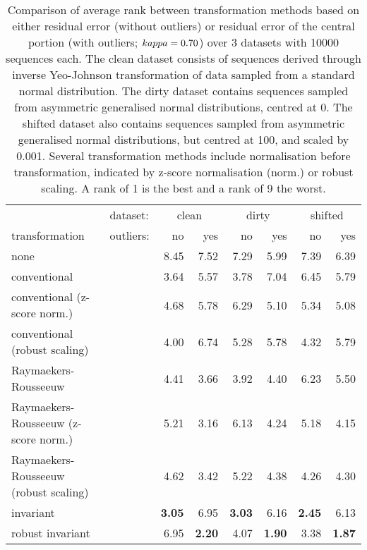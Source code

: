 \documentclass[
  a4paper,
]{article}
\begin{document}
\begin{table}
\begin{center}
\caption{
Comparison of average rank between transformation methods based on either residual error (without outliers) or residual error of the central portion
(with outliers; $\\kappa = 0.70$) over 3 datasets with 10000 sequences each. The clean dataset consists of sequences derived through inverse Yeo-Johnson transformation
of data sampled from a standard normal distribution. The dirty dataset contains sequences sampled from asymmetric generalised normal distributions, centred at 0.
The shifted dataset also contains sequences sampled from asymmetric generalised normal distributions, but centred at 100, and scaled by 0.001.
Several transformation methods include normalisation before transformation, indicated by z-score normalisation (norm.) or robust scaling.
A rank of 1 is the best and a rank of 9 the worst.
}
\label{tab:comparison_methods_simulations}
\begin{tabular}{l | l r r r r r r}

\toprule
& dataset: & \multicolumn{2}{c}{clean} & \multicolumn{2}{c}{dirty} & \multicolumn{2}{c}{shifted} \\
transformation & outliers: & no & yes & no & yes & no & yes \\

\midrule

none                                  & &         8.45  &         7.52  &         7.29  &         5.99  &         7.39  &         6.39 \\
conventional                          & &         3.64  &         5.57  &         3.78  &         7.04  &         6.45  &         5.79 \\
conventional (z-score norm.)          & &         4.68  &         5.78  &         6.29  &         5.10  &         5.34  &         5.08 \\
conventional (robust scaling)         & &         4.00  &         6.74  &         5.28  &         5.78  &         4.32  &         5.79 \\
Raymaekers-Rousseeuw                  & &         4.41  &         3.66  &         3.92  &         4.40  &         6.23  &         5.50 \\
Raymaekers-Rousseeuw (z-score norm.)  & &         5.21  &         3.16  &         6.13  &         4.24  &         5.18  &         4.15 \\
Raymaekers-Rousseeuw (robust scaling) & &         4.62  &         3.42  &         5.22  &         4.38  &         4.26  &         4.30 \\
invariant                             & & \textbf{3.05} &         6.95  & \textbf{3.03} &         6.16  & \textbf{2.45} &         6.13 \\
robust invariant                      & &         6.95  & \textbf{2.20} &         4.07  & \textbf{1.90} &         3.38  & \textbf{1.87} \\

\bottomrule
\end{tabular}
\end{center}
\end{table}
\end{document}
